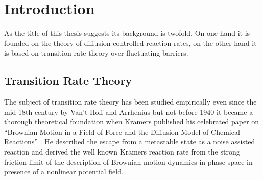 \setcounter{page}{1}
\chapter{Introduction}
\label{intro}

As the title of this thesis suggests its background is twofold. On one hand it is founded on the theory of diffusion controlled reaction rates, on the other hand it is based on transition rate theory over fluctuating barriers. \\

\section{Transition Rate Theory} 

The subject of transition rate theory has been studied empirically even since the mid 18th century by Van't Hoff \cite{hoff1884} and Arrhenius \cite{arrhenius1889} but not before 1940 it became a thorough theoretical foundation when Kramers published his celebrated paper on ``Brownian Motion in a Field of Force and the Diffusion Model of Chemical Reactions'' \cite{Kramers1940}.  He described the escape from a metastable state as a noise assisted reaction and derived the well known Kramers reaction rate from the strong friction limit of the description of Brownian motion dynamics in phase space in presence of a nonlinear potential field.\vspace{- .5 cm} \par

